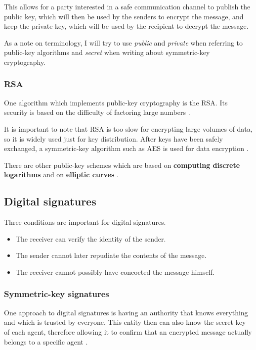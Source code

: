 This allows for a party interested in a safe communication channel to publish the public key, which will then be used by the senders to encrypt the message, and keep the private key, which will be used by the recipient to decrypt the message.

As a note on terminology, I will try to use \textit{public} and \textit{private} when referring to public-key algorithms and \textit{secret} when writing about symmetric-key cryptography.

\subsubsection{RSA}

One algorithm which implements public-key cryptography is the RSA.
Its security is based on the difficulty of factoring large numbers \cite[p.~795]{computer-networks-tanenbaum-2012}.

It is important to note that RSA is too slow for encrypting large volumes of data, so it is widely used just for key distribution.
After keys have been safely exchanged, a symmetric-key algorithm such as AES is used for data encryption \cite[p.~796]{computer-networks-tanenbaum-2012}.

There are other public-key schemes which are based on \textbf{computing discrete logarithms} and on \textbf{elliptic curves} \cite[p.~797]{computer-networks-tanenbaum-2012}.

\subsection{Digital signatures}

Three conditions are important for digital signatures.

\begin{itemize}
\item The receiver can verify the identity of the sender.
\item The sender cannot later repudiate the contents of the message.
\item The receiver cannot possibly have concocted the message himself.
\end{itemize}

\subsubsection{Symmetric-key signatures}

One approach to digital signatures is having an authority that knows everything and which is trusted by everyone.
This entity then can also know the secret key of each agent, therefore allowing it to confirm that an encrypted message actually belongs to a specific agent \cite[p.~798]{computer-networks-tanenbaum-2012}.

